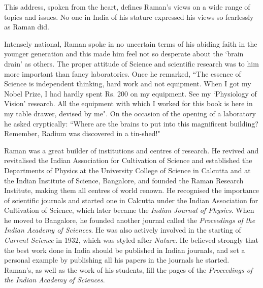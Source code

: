 This address, spoken from the heart, defines Raman's views on a wide range of topics and issues. No one in India of his stature expressed his views so fearlessly as Raman did.

Intensely national, Raman spoke in no uncertain terms of his abiding faith in the younger generation and this made him feel not so desperate about the `brain drain' as others. The proper attitude of Science and scientific research was to him more important than fancy laboratories. Once he remarked, ``The essence of Science is independent thinking, hard work and not equipment. When I got my Nobel Prize, I had hardly spent Rs. 200 on my equipment. See my `Physiology of Vision' research. All the equipment with which I worked for this book is here in my table drawer, devised by me". On the occasion of the opening of a laboratory he asked cryptically: ``Where are the brains to put into this magnificent building? Remember, Radium was discovered in a tin-shed!"

\medskip
{}
\smallskip



\noindent
Raman was a great builder of institutions and centres of research. He revived and revitalised the Indian Association for Cultivation of Science and established the Departments of Phy\-sics at the University College of Science in Calcutta and at the Indian Institute of Science, Bangalore, and founded the Raman Research Institute, making them all centres of world renown. He recognised the importance of scientific journals and started one in Calcutta under the Indian Association for Cultivation of Science, which later became the {\em Indian Journal of Physics}. When he moved to Bangalore, he founded another journal called the {\em Proceedings of the Indian Academy of Sciences}. He was also actively involved in the starting of {\em Current Science} in 1932, which was styled after {\em Nature}. He believed strongly that the best work done in India should be published in Indian journals, and set a personal example by publishing all his papers in the journals he started. Raman's, as well as the work of his students, fill the pages of the {\em Proceedings of the Indian Academy of Sciences}.

